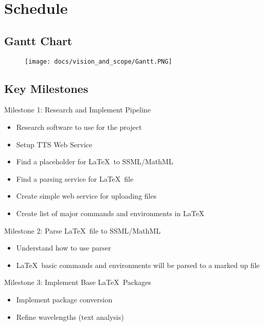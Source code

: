 \section{Schedule}

\subsection{Gantt Chart}
\begin{figure}[h]
\texttt{[image: docs/vision\_and\_scope/Gantt.PNG]}
\end{figure}

\subsection{Key Milestones}
Milestone 1: Research and Implement Pipeline
\begin{itemize}
    \itemsep0em
    \item Research software to use for the project
    \item Setup TTS Web Service
    \item Find a placeholder for \LaTeX\ to SSML/MathML
    \item Find a parsing service for \LaTeX\ file
    \item Create simple web service for uploading files
    \item Create list of major commands and environments in \LaTeX\
\end{itemize}
Milestone 2: Parse \LaTeX\ file to SSML/MathML
\begin{itemize}
    \itemsep0em
    \item Understand how to use parser
    \item \LaTeX\ basic commands and environments will be parsed to a marked up file
\end{itemize}
Milestone 3: Implement Base \LaTeX\ Packages
\begin{itemize}
    \itemsep0em
    \item Implement package conversion
    \item Refine wavelengths (text analysis)
\end{itemize}
